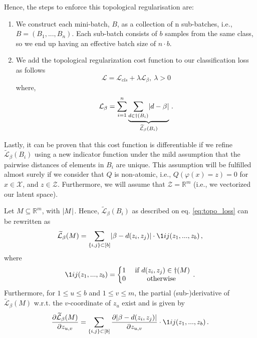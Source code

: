 \documentclass[../main.tex]{subfiles}
\begin{document}
Hence, the steps to enforce this topological regularisation are:

\begin{enumerate}
    \item We construct each mini-batch, $B$, as a collection of n sub-batches, i.e., $B = (B_1, . . . , B_n)$. Each sub-batch consists of $b$ samples from the same class, so we end up having an effective batch size of $n\cdot b$.
    \item We add the topological regularization cost function to our classification loss as follows
    \begin{equation}
    \label{eq:topo_reg}
    \mathcal{L} = \mathcal{L}_{cls} + \lambda\mathcal{L}_\beta,\ \lambda > 0 
    \end{equation}
    where,
    \begin{equation}
    \label{eq:topo_loss}
    \mathcal{L}_\beta = \sum_{i=1}^{n} \underbrace{\sum_{d \in \dag(B_i)} \lvert d-\beta\rvert}_{\widetilde{\mathcal{L}}_\beta(B_i)}\,.
    \end{equation}
\end{enumerate}

Lastly, it can be proven that this cost function is differentiable if we refine $\tilde{\mathcal{L}}_\beta(B_i)$ using a new indicator function under the mild assumption that the pairwise distances of elements in $B_i$ are unique. This assumption will be fulfilled almost surely if we consider that $Q$ is non-atomic, i.e., $Q(\varphi(x) = z)=0$ for $x \in \mathcal{X}$, and $z \in \mathcal{Z}$. Furthermore, we will assume that $\mathcal{Z}=\mathbb{R}^m$ (i.e., we vectorized our latent space).

\begin{theorem}
Let $M \subseteq \mathbb{R}^m$, with $\lvert M\rvert$. Hence, $\widetilde{\mathcal{L}}_\beta(B_i)$ as described on eq. \ref{eq:topo_loss} can be rewritten as
\[
\widetilde{\mathcal{L}}_\beta(M) = \sum_{\{i,j\} \subset [b]} \abs{\beta - d(z_i, z_j)} \cdot \1{i}{j}(z_1, ..., z_b)\,,
\]
where
\[
\1{i}{j}(z_1, ..., z_b) = \left\{\begin{matrix}
1 & \text{ if } d(z_i, z_j) \in \dag(M)\\
0 & \text{ otherwise } \\
\end{matrix}\right.\,.
\]
Furthermore, for $1\leq u \leq b$ and $1 \leq v \leq m$, the partial (sub-)derivative of  $\widetilde{\mathcal{L}}_\beta(M)$ w.r.t. the $v$-coordinate of $z_u$ exist and is given by
\[
\frac{\partial \widetilde{\mathcal{L}}_\beta(M)}{\partial z_{u,v}} = \sum_{\{i,j\} \subset [b]} \frac{\partial \abs{\beta - d(z_i, z_j)}}{\partial z_{u,v}} \cdot \1{i}{j}(z_1, ..., z_b)\,.
\]
\end{theorem}
\end{document}
